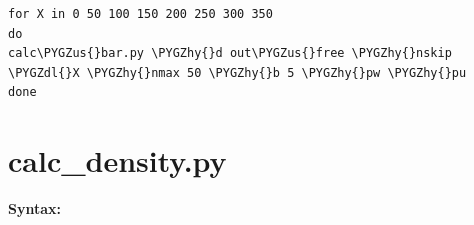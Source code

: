 \documentclass[letterpaper,10pt,english]{sphinxmanual}
\def\PYGZus{\char`\_}
\def\PYGZdl{\char`\$}
\def\PYGZhy{\char`\-}
\begin{document}
\begin{Verbatim}[frame=single,commandchars=\\\{\}]
for X in 0 50 100 150 200 250 300 350
do
calc\PYGZus{}bar.py \PYGZhy{}d out\PYGZus{}free \PYGZhy{}nskip \PYGZdl{}X \PYGZhy{}nmax 50 \PYGZhy{}b 5 \PYGZhy{}pw \PYGZhy{}pu
done
\end{Verbatim}


\section{calc\_density.py}
\label{tools:calc-density-py}
\textbf{Syntax:}

\end{document}
